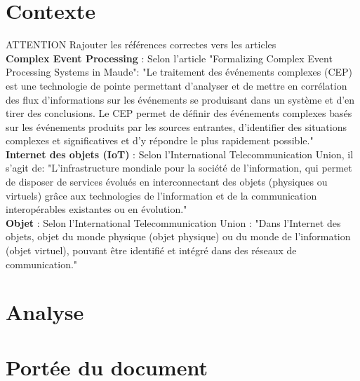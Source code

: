 \documentclass[12pt]{article}
\begin{document}
\newpage

\section{Contexte}

ATTENTION Rajouter les références correctes vers les articles
\\

\textbf{Complex Event Processing} : Selon l'article "Formalizing Complex Event Processing Systems in Maude": "Le traitement des événements complexes (CEP) est une technologie de pointe permettant d'analyser et de mettre en corrélation des flux d'informations sur les événements se produisant dans un système et d'en tirer des conclusions. Le CEP permet de définir des événements complexes basés sur les événements produits par les sources entrantes, d'identifier des situations complexes et significatives et d'y répondre le plus rapidement possible."\\

\textbf{Internet des objets (IoT)} : Selon l'International Telecommunication Union, il s'agit de: "L'infrastructure mondiale pour la société de l'information, qui permet de disposer de services évolués en interconnectant des objets (physiques ou virtuels) grâce aux technologies de l'information et de la communication interopérables existantes ou en évolution." \\

\textbf{Objet} : Selon l'International Telecommunication Union : "Dans l'Internet des objets, objet du monde physique (objet physique) ou du monde de l'information (objet virtuel), pouvant être identifié et intégré dans des réseaux de communication."

\section{Analyse}



\section{Portée du document}
\end{document}
